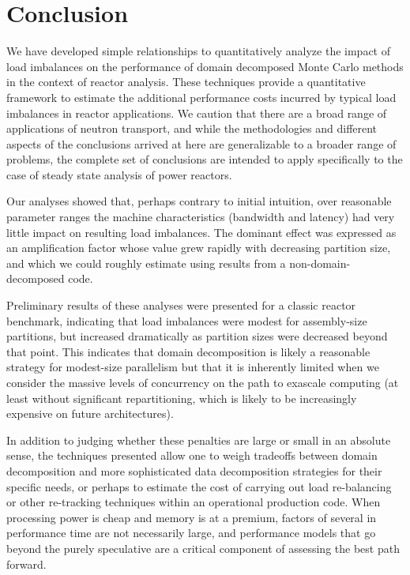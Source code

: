 \section{Conclusion}

We have developed simple relationships to quantitatively analyze the impact of
load imbalances on the performance of domain decomposed Monte Carlo methods in
the context of reactor analysis. These techniques provide a quantitative
framework to estimate the additional performance costs incurred by typical load
imbalances in reactor applications. We caution that there are a broad range of
applications of neutron transport, and while the methodologies and different
aspects of the conclusions arrived at here are generalizable to a broader range
of problems, the complete set of conclusions are intended to apply specifically
to the case of steady state analysis of power reactors.

Our analyses showed that, perhaps contrary to initial intuition, over reasonable
parameter ranges the machine characteristics (bandwidth and latency) had very
little impact on resulting load imbalances. The dominant effect was expressed as
an amplification factor whose value grew rapidly with decreasing partition size,
and which we could roughly estimate using results from a non-domain-decomposed
code.

Preliminary results of these analyses were presented for a classic reactor
benchmark, indicating that load imbalances were modest for assembly-size
partitions, but increased dramatically as partition sizes were decreased beyond
that point. This indicates that domain decomposition is likely a reasonable
strategy for modest-size parallelism but that it is inherently limited when we
consider the massive levels of concurrency on the path to exascale computing (at
least without significant repartitioning, which is likely to be increasingly
expensive on future architectures).

In addition to judging whether these penalties are large or small in an absolute
sense, the techniques presented allow one to weigh tradeoffs between domain
decomposition and more sophisticated data decomposition strategies for their
specific needs, or perhaps to estimate the cost of carrying out load
re-balancing or other re-tracking techniques within an operational production
code. When processing power is cheap and memory is at a premium, factors of
several in performance time are not necessarily large, and performance models
that go beyond the purely speculative are a critical component of assessing the
best path forward.
